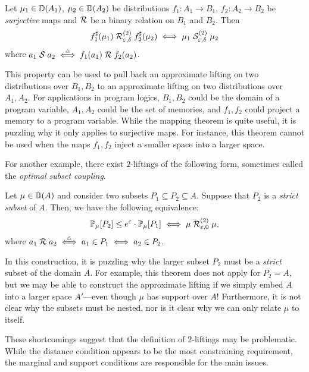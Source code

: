 \documentclass{lmcs}
\begin{document}
\begin{thm} \label{t:map:restr}
  Let $\mu_1 \in {\mathbb{D}}(A_1)$, $\mu_2 \in {\mathbb{D}}(A_2)$ be distributions
  $f_1 : A_1 \to B_1$, $f_2 : A_2 \to B_2$ be \emph{surjective} maps and $\mathrel{\mathcal{R}}$
  be a binary relation on $B_1$ and $B_2$. Then
  \[
    f_1^{\sharp}(\mu_1) \mathrel{\mathrel{\mathcal{R}}^{(2)}_{\varepsilon,\delta}} f_2^{\sharp}(\mu_2)
    \iff
    \mu_1 \mathrel{\mathrel{\mathcal{S}}^{(2)}_{\varepsilon,\delta}} \mu_2
  \]
  where
  $a_1 \mathrel{\mathrel{\mathcal{S}}} a_2
    \mathrel{\stackrel{\scriptscriptstyle \triangle}{\iff}} f_1(a_1) \mathrel{\mathcal{R}} f_2(a_2)$.
\end{thm}

This property can be used to pull back an approximate lifting on two
distributions over $B_1, B_2$ to an approximate lifting on two distributions
over $A_1, A_2$. For applications in program logics, $B_1, B_2$ could be the
domain of a program variable, $A_1, A_2$ could be the set of memories, and $f_1,
f_2$ could project a memory to a program variable. While the mapping theorem is
quite useful, it is puzzling why it only applies to surjective maps. For
instance, this theorem cannot be used when the maps $f_1, f_2$ inject a smaller
space into a larger space.

For another example, there exist $2$-liftings of the following form, sometimes
called the \emph{optimal subset coupling}.

\begin{thm} \label{t:subset:opt}
  Let $\mu  \in {\mathbb{D}}(A)$ and consider two subsets $P_1 \subseteq P_2 \subseteq
  A$. Suppose that $P_2$ is a \emph{strict subset} of $A$. Then, we have the
  following equivalence:
  \[
    \mathbb{P}_{\mu} [{P_2}] \leq e^\varepsilon \cdot \mathbb{P}_{\mu} [{P_1}]
    \iff
    \mu \mathrel{\mathrel{\mathcal{R}}^{(2)}_{\varepsilon, 0}} \mu ,
  \]
  where
  $a_1 \mathrel{\mathrel{\mathcal{R}}} a_2
    \mathrel{\stackrel{\scriptscriptstyle \triangle}{\iff}} a_1 \in P_1 \iff a_2 \in P_2$.
\end{thm}

In this construction, it is puzzling why the larger subset $P_2$ must be a
\emph{strict} subset of the domain $A$. For example, this theorem does not apply
for $P_2 = A$, but we may be able to construct the approximate lifting if we
simply embed $A$ into a larger space $A'$---even though $\mu$ has support over
$A$! Furthermore, it is not clear why the subsets must be nested, nor is it
clear why we can only relate $\mu$ to itself.

These shortcomings suggest that the definition of $2$-liftings may be
problematic. While the distance condition appears to be the most constraining
requirement, the marginal and support conditions are responsible for the main
issues.
\end{document}

